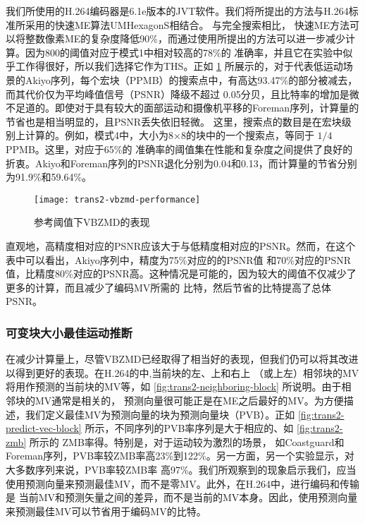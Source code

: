 我们所使用的H.264编码器是6.1e版本的JVT软件。我们将所提出的方法与H.264标准所采用的快速ME算法UMHexagonS相结合。 与完全搜索相比，
快速ME方法可以将整数像素ME的复杂度降低90\%，而通过使用所提出的方法可以进一步减少计算。因为800的阈值对应于模式1中相对较高的78\%的
准确率，并且它在实验中似乎工作得很好，所以我们选择它作为THS。正如 \ref{fig:trans2-vbzmd-performance} 所展示的，对于代表低运动场景的Akiyo序列，每个宏块（PPMB）的搜索点中，有高达93.47\%的部分被减去，而其代价仅为平均峰值信号（PSNR）降级不超过
0.05分贝，且比特率的增加是微不足道的。即使对于具有较大的面部运动和摄像机平移的Foreman序列，计算量的节省也是相当明显的，且PSNR丢失依旧轻微。
这里，搜索点的数目是在宏块级别上计算的。例如，模式4中，大小为8×8的块中的一个搜索点，等同于 $1/4$ PPMB。这里，对应于65\%的
准确率的阈值集在性能和复杂度之间提供了良好的折衷。Akiyo和Foreman序列的PSNR退化分别为0.04和0.13，而计算量的节省分别为91.9\%和59.64\%。

\begin{figure}[H] %
  \centering
  \texttt{[image: trans2-vbzmd-performance]}
  \caption{参考阈值下VBZMD的表现}
  \label{fig:trans2-vbzmd-performance}
\end{figure}

直观地，高精度相对应的PSNR应该大于与低精度相对应的PSNR。然而，在这个表中可以看出，Akiyo序列中，精度为75\%对应的的PSNR值
和70\%对应的PSNR值，比精度80\%对应的PSNR高。这种情况是可能的，因为较大的阈值不仅减少了更多的计算，而且减少了编码MV所需的
比特，然后节省的比特提高了总体PSNR。

\subsubsection{可变块大小最佳运动推断}
\label{sec:vbbmd}

在减少计算量上，尽管VBZMD已经取得了相当好的表现，但我们仍可以将其改进以得到更好的表现。在H.264的中,当前块的左、上和右上
（或上左）相邻块的MV将用作预测的当前块的MV等，如 \ref{fig:trans2-neighboring-block} 所说明。由于相邻块的MV通常是相关的，
预测向量很可能正是在ME之后最好的MV。为方便描述，我们定义最佳MV为预测向量的块为预测向量块（PVB）。正如 \ref{fig:trans2-predict-vec-block} 所示，不同序列的PVB率序列是大于相应的、如 \ref{fig:trans2-zmb} 所示的 ZMB率得。特别是，对于运动较为激烈的场景，
如Coastguard和Foreman序列，PVB率较ZMB率高23\%到122\%。另一方面，另一个实验显示，对大多数序列来说，PVB率较ZMB率
高97\%。我们所观察到的现象启示我们，应当使用预测向量来预测最佳MV，而不是零MV。此外，在H.264中，进行编码和传输是
当前MV和预测矢量之间的差异，而不是当前的MV本身。因此，使用预测向量来预测最佳MV可以节省用于编码MV的比特。

